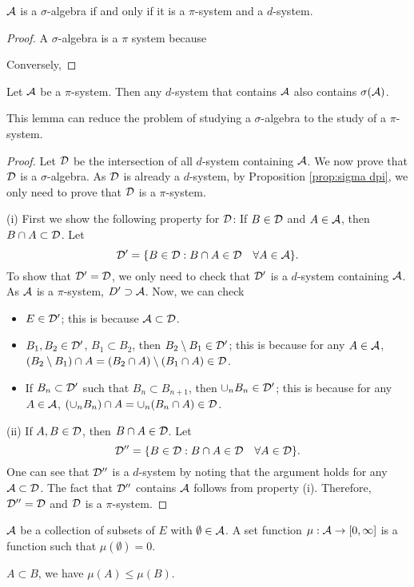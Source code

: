 \begin{proposition}\label{prop:sigma dpi}
    $\mathcal{A}$ is a $\sigma$-algebra if and only if it is a $\pi$-system and a $d$-system.
\end{proposition}
\begin{proof}
    A $\sigma$-algebra is a $\pi$ system because

    Conversely, 
\end{proof}

\begin{lemma}
    Let $\mathcal{A}$ be a $\pi$-system. Then any $d$-system that contains $\mathcal{A}$ also contains $\sigma(\mathcal{A})$.
\end{lemma}
This lemma can reduce the problem of studying a $\sigma$-algebra to the study of a $\pi$-system.
\begin{proof}
    Let $\mathcal{D}$ be the intersection of all $d$-system containing $\mathcal{A}$.
    We now prove that $\mathcal{D}$ is a $\sigma$-algebra. 
    As $\mathcal{D}$ is already a $d$-system, by Proposition \ref{prop:sigma dpi}, we only need to prove that $\mathcal{D}$ is a $\pi$-system.

    (i) First we show the following property for $\mathcal{D}$: If $B\in\mathcal{D}$ and $A\in\mathcal{A}$, then $B\cap A\subset\mathcal{D}$.
    Let $$\mathcal{D}'=\{B\in\mathcal{D}:B\cap A\in \mathcal{D}\quad \forall A\in\mathcal{A}\}.$$ 
    To show that $\mathcal{D}'=\mathcal{D}$, we only need to check that $\mathcal{D}'$ is a $d$-system containing $\mathcal{A}$.
    As $\mathcal{A}$ is a $\pi$-system, $D'\supset \mathcal{A}$. 
    Now, we can check
    \begin{itemize}
        \item $E\in\mathcal{D}'$; this is because $\mathcal{A}\subset\mathcal{D}$.
        \item $B_1,B_2\in\mathcal{D}'$, $B_1\subset B_2$, then $B_2\setminus B_1 \in\mathcal{D}'$; this is because for any $A\in\mathcal{A}$, $(B_2\setminus B_1)\cap A = (B_2\cap A)\setminus (B_1\cap A ) \in\mathcal{D}$.
        \item If $B_n\subset \mathcal{D}'$ such that $B_n\subset B_{n+1}$, then $\cup_{n}B_n\in\mathcal{D}'$; this is because for any $A\in\mathcal{A}$, $(\cup_{n}B_n)\cap A=\cup_n (B_n\cap A)\in\mathcal{D}$.
    \end{itemize}

    (ii) If $A,B\in\mathcal{D}$, then $B\cap A\in\mathcal{D}$.
    Let $$\mathcal{D}''=\{B\in\mathcal{D}:B\cap A\in \mathcal{D}\quad \forall A\in\mathcal{D}\}.$$ One can see that $\mathcal{D}''$ is a $d$-system by noting that the argument holds for any $\mathcal{A}\subset\mathcal{D}$.
    The fact that $\mathcal{D}''$ contains $\mathcal{A}$ follows from property (i). Therefore, $\mathcal{D}''=\mathcal{D}$ and $\mathcal{D}$ is a $\pi$-system.
\end{proof}





\begin{definition}
    $\mathcal{A}$ be a collection of subsets of $E$ with $\emptyset\in\mathcal{A}$.
    A set function $\mu:\mathcal{A}\to [0,\infty]$ is a function such that $\mu(\emptyset)=0$.
\end{definition}

\begin{definition}
    $A\subset B$, we have $\mu(A)\leq \mu(B)$.
\end{definition}
